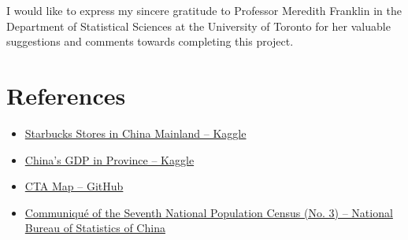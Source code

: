 \documentclass{article}
\begin{document}
I would like to express my sincere gratitude to Professor Meredith Franklin in the Department of Statistical Sciences at the University of Toronto for her valuable suggestions and comments towards completing this project.

\section{References}

\begin{itemize}
    \item \href{https://www.kaggle.com/datasets/saneryee/starbucks-stores-in-china-mainland}{Starbucks Stores in China Mainland -- Kaggle}
    \item \href{https://www.kaggle.com/datasets/concyclics/chinas-gdp-in-province?select=Chinas+GDP+in+Province+En.csv}{China's GDP in Province -- Kaggle}
    \item \href{https://github.com/ruiduobao/shengshixian.com}{CTA Map -- GitHub}
    \item \href{https://www.stats.gov.cn/english/PressRelease/202105/t20210510_1817188.html}{Communiqué of the Seventh National Population Census (No. 3) – National Bureau of Statistics of China}
\end{itemize}
\end{document}
